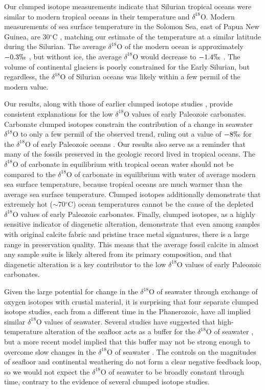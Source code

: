 \documentclass{article}
\newcommand{\deltao}{$\delta^{18}$}
\newcommand{\degrees}{$^{\circ}$}
\begin{document}
Our clumped isotope measurements indicate that Silurian tropical oceans were similar to modern tropical oceans in their temperature and \deltao O. Modern measurements of sea surface temperature in the Solomon Sea, east of Papua New Guinea, are 30\degrees C \citep{Reynolds1994}, matching our estimate of the temperature at a similar latitude during the Silurian. The average \deltao O of the modern ocean is approximately $-0.3\permil$ \citep{Shackleton1974}, but without ice, the average \deltao O would decrease to $-1.4\permil$ \citep{Lhomme2005}. The volume of continental glaciers is poorly constrained for the Early Silurian, but regardless, the \deltao O of Silurian oceans was likely within a few permil of the modern value. 

Our results, along with those of earlier clumped isotope studies \citep{Came2007,Finnegan2011,Dennis2013}, provide consistent explanations for the low \deltao O values of early Paleozoic carbonates. Carbonate clumped isotopes constrain the contribution of a change in seawater \deltao O to only a few permil of the observed trend, ruling out a value of $-8\permil$ for the \deltao O of early Paleozoic oceans \citep{Grossman2012}. Our results also serve as a reminder that many of the fossils preserved in the geologic record lived in tropical oceans. The \deltao O of carbonate in equilibrium with tropical ocean water should not be compared to the \deltao O of carbonate in equilibrium with water of average modern sea surface temperature, because tropical oceans are much warmer than the average sea surface temperature. Clumped isotopes additionally demonstrate that extremely hot ($\sim 70$\degrees C) ocean temperatures cannot be the cause of the depleted \deltao O values of early Paleozoic carbonates. Finally, clumped isotopes, as a highly sensitive indicator of diagenetic alteration, demonstrate that even among samples with original calcite fabric and pristine trace metal signatures, there is a large range in preservation quality. This means that the average fossil calcite in almost any sample suite is likely altered from its primary composition, and that diagenetic alteration is a key contributor to the low \deltao O values of early Paleozoic carbonates. 

Given the large potential for change in the \deltao O of seawater through exchange of oxygen isotopes with crustal material, it is surprising that four separate clumped isotope studies, each from a different time in the Phanerozoic, have all implied similar \deltao O values of seawater.  Several studies have suggested that high-temperature alteration of the seafloor acts as a buffer for the \deltao O of seawater \citep{Muehlenbachs1976,Gregory1981,Gregory1991,Muehlenbachs1998}, but a more recent model implied that this buffer may not be strong enough to overcome slow changes in the \deltao O of seawater \citep{Jaffres2007}. The controls on the magnitudes of seafloor and continental weathering do not form a clear negative feedback loop, so we would not expect the \deltao O of seawater to be broadly constant through time, contrary to the evidence of several clumped isotope studies. 
\end{document}
